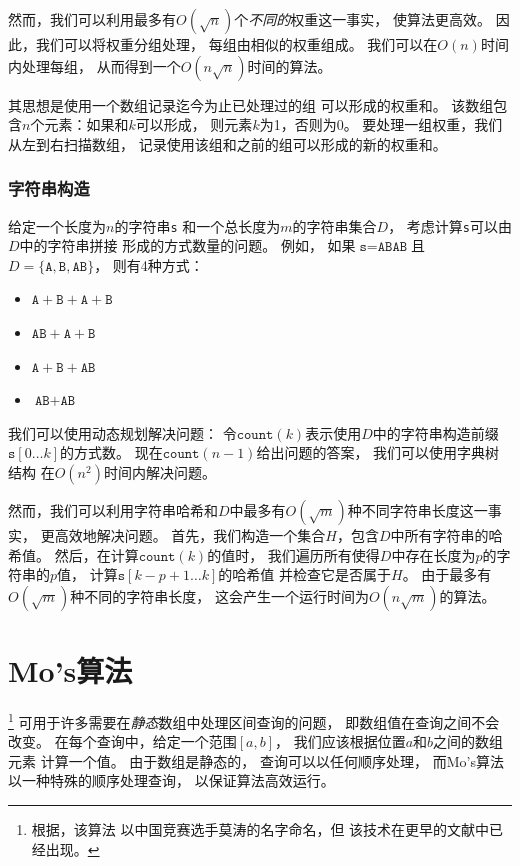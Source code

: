 然而，我们可以利用最多有$O(\sqrt n)$个\emph{不同的}权重这一事实，
使算法更高效。
因此，我们可以将权重分组处理，
每组由相似的权重组成。
我们可以在$O(n)$时间内处理每组，
从而得到一个$O(n \sqrt n)$时间的算法。

其思想是使用一个数组记录迄今为止已处理过的组
可以形成的权重和。
该数组包含$n$个元素：如果和$k$可以形成，
则元素$k$为1，否则为0。
要处理一组权重，我们从左到右扫描数组，
记录使用该组和之前的组可以形成的新的权重和。

\subsubsection{字符串构造}

给定一个长度为$n$的字符串\texttt{s}
和一个总长度为$m$的字符串集合$D$，
考虑计算\texttt{s}可以由$D$中的字符串拼接
形成的方式数量的问题。
例如，
如果$\texttt{s}=\texttt{ABAB}$且
$D=\{\texttt{A},\texttt{B},\texttt{AB}\}$，
则有4种方式：

\begin{itemize}[noitemsep]
\item $\texttt{A}+\texttt{B}+\texttt{A}+\texttt{B}$
\item $\texttt{AB}+\texttt{A}+\texttt{B}$
\item $\texttt{A}+\texttt{B}+\texttt{AB}$
\item $\texttt{AB}+\texttt{AB}$
\end{itemize}

我们可以使用动态规划解决问题：
令$\texttt{count}(k)$表示使用$D$中的字符串构造前缀
$\texttt{s}[0 \ldots k]$的方式数。
现在$\texttt{count}(n-1)$给出问题的答案，
我们可以使用字典树结构
在$O(n^2)$时间内解决问题。

然而，我们可以利用字符串哈希和$D$中最多有$O(\sqrt m)$种不同字符串长度这一事实，
更高效地解决问题。
首先，我们构造一个集合$H$，包含$D$中所有字符串的哈希值。
然后，在计算$\texttt{count}(k)$的值时，
我们遍历所有使得$D$中存在长度为$p$的字符串的$p$值，
计算$\texttt{s}[k-p+1 \ldots k]$的哈希值
并检查它是否属于$H$。
由于最多有$O(\sqrt m)$种不同的字符串长度，
这会产生一个运行时间为$O(n \sqrt m)$的算法。

\section{Mo's算法}


\footnote{根据\cite{cod15}，该算法
以中国竞赛选手莫涛的名字命名，但
该技术在更早的文献中已经出现\cite{ken06}。}
可用于许多需要在\emph{静态}数组中处理区间查询的问题，
即数组值在查询之间不会改变。
在每个查询中，给定一个范围$[a,b]$，
我们应该根据位置$a$和$b$之间的数组元素
计算一个值。
由于数组是静态的，
查询可以以任何顺序处理，
而Mo's算法以一种特殊的顺序处理查询，
以保证算法高效运行。

